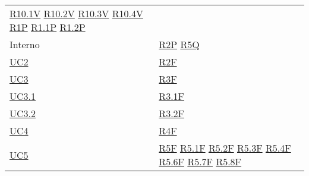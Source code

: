 \begin{center}
\begin{longtable}[!h]{m{50px} m{50px}}
        \newline \hyperref[tab:RequisitiVincolo]{R10.1V}
        \newline \hyperref[tab:RequisitiVincolo]{R10.2V}
        \newline \hyperref[tab:RequisitiVincolo]{R10.3V}
        \newline \hyperref[tab:RequisitiVincolo]{R10.4V}
        \newline \hyperref[tab:RequisitiPrestazionali]{R1P}
        \newline \hyperref[tab:RequisitiPrestazionali]{R1.1P}
        \newline \hyperref[tab:RequisitiPrestazionali]{R1.2P}                          \\

        Interno                           & \hyperref[tab:RequisitiPrestazionali]{R2P}
        \newline \hyperref[tab:RequisitiQualita]{R5Q}                                  \\

        \hyperref[sec:UC2]{UC2}           & \hyperref[tab:RequisitiFunzionali]{R2F}    \\
        \hyperref[sec:UC3]{UC3}           & \hyperref[tab:RequisitiFunzionali]{R3F}    \\
        \hyperref[sec:UC3.1]{UC3.1}       & \hyperref[tab:RequisitiFunzionali]{R3.1F}  \\
        \hyperref[sec:UC3.2]{UC3.2}       & \hyperref[tab:RequisitiFunzionali]{R3.2F}  \\
        \hyperref[sec:UC4]{UC4}           & \hyperref[tab:RequisitiFunzionali]{R4F}    \\

        \hyperref[sec:UC5]{UC5}           & \hyperref[tab:RequisitiFunzionali]{R5F}
        \newline \hyperref[tab:RequisitiFunzionali]{R5.1F}
        \newline \hyperref[tab:RequisitiFunzionali]{R5.2F}
        \newline \hyperref[tab:RequisitiFunzionali]{R5.3F}
        \newline \hyperref[tab:RequisitiFunzionali]{R5.4F}
        \newline \hyperref[tab:RequisitiFunzionali]{R5.6F}
        \newline \hyperref[tab:RequisitiFunzionali]{R5.7F}
        \newline \hyperref[tab:RequisitiFunzionali]{R5.8F}                             \\


\end{longtable}
\end{center}

